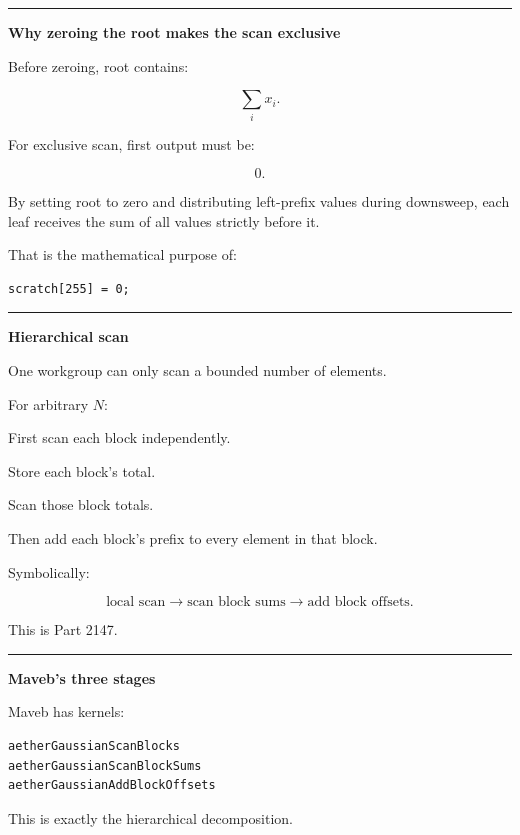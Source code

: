\begin{center}\rule{0.5\linewidth}{0.5pt}\end{center}

\textbf{Why zeroing the root makes the scan exclusive}

Before zeroing, root contains:

\[
\sum_i x_i.
\]

For exclusive scan, first output must be:

\[
0.
\]

By setting root to zero and distributing left-prefix values during downsweep, each leaf receives the sum of all values strictly before it.

That is the mathematical purpose of:

\protect{}\label{t9o8ez}%
\begin{verbatim}
scratch[255] = 0;
\end{verbatim}

\begin{center}\rule{0.5\linewidth}{0.5pt}\end{center}

\textbf{Hierarchical scan}

One workgroup can only scan a bounded number of elements.

For arbitrary \(N\):

First scan each block independently.

Store each block's total.

Scan those block totals.

Then add each block's prefix to every element in that block.

Symbolically:

\[
\boxed{
\text{local scan}
\rightarrow
\text{scan block sums}
\rightarrow
\text{add block offsets}.
}
\]

This is Part 2147.

\begin{center}\rule{0.5\linewidth}{0.5pt}\end{center}

\textbf{Maveb's three stages}

Maveb has kernels:

\protect{}\label{r92vsu}%
\begin{verbatim}
aetherGaussianScanBlocks
aetherGaussianScanBlockSums
aetherGaussianAddBlockOffsets
\end{verbatim}

This is exactly the hierarchical decomposition.

